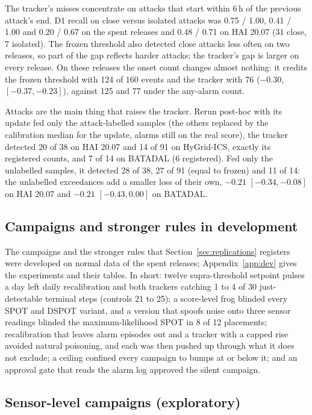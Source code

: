 \documentclass[sigconf,review,anonymous]{acmart}
\begin{document}
The tracker's misses concentrate on attacks that start within 6\,h of the previous attack's end. D1
recall on close versus isolated attacks was 0.75 / 1.00, 0.41 / 1.00 and 0.20 / 0.67 on the spent
releases and 0.48 / 0.71 on HAI 20.07 (31 close, 7 isolated). The frozen threshold also detected
close attacks less often on two releases, so part of the gap reflects harder attacks; the tracker's
gap is larger on every release. On these releases the onset count changes almost nothing: it credits
the frozen threshold with 124 of 160 events and the tracker with 76 ($-0.30$, $[-0.37, -0.23]$),
against 125 and 77 under the any-alarm count.

Attacks are the main thing that raises the tracker. Rerun post-hoc with its update fed only the
attack-labelled samples (the others replaced by the calibration median for the update, alarms still on
the real score), the tracker detected 20 of 38 on HAI 20.07 and 14 of 91 on HyGrid-ICS, exactly its
registered counts, and 7 of 14 on BATADAL (6 registered). Fed only the unlabelled samples, it detected
28 of 38, 27 of 91 (equal to frozen) and 11 of 14: the unlabelled exceedances add a smaller loss of
their own, $-0.21$ $[-0.34, -0.08]$ on HAI 20.07 and $-0.21$ $[-0.43, 0.00]$ on BATADAL.

\subsection{Campaigns and stronger rules in development}
\label{sec:devsummary}

The campaigns and the stronger rules that Section~\ref{sec:replications} registers were developed on
normal data of the spent releases; Appendix~\ref{app:dev} gives the experiments and their tables. In
short: twelve supra-threshold setpoint pulses a day left daily recalibration and both trackers catching
1 to 4 of 30 just-detectable terminal steps (controls 21 to 25); a score-level frog blinded every SPOT
and DSPOT variant, and a version that spoofs noise onto three sensor readings blinded the
maximum-likelihood SPOT in 8 of 12 placements; recalibration that leaves alarm episodes out and a
tracker with a capped rise avoided natural poisoning, and each was then pushed up through what it does
not exclude; a ceiling confined every campaign to bumps at or below it; and an approval gate that
reads the alarm log approved the silent campaign.

\subsection{Sensor-level campaigns (exploratory)}
\label{sec:process}
\end{document}
